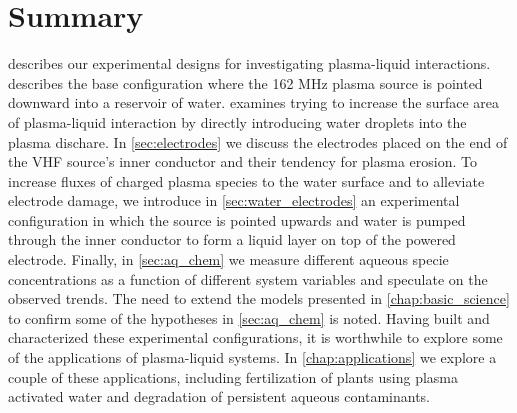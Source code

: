 \section{Summary}

 describes our experimental designs for investigating plasma-liquid interactions.  describes the base configuration where the 162 MHz plasma source is pointed downward into a reservoir of water.  examines trying to increase the surface area of plasma-liquid interaction by directly introducing water droplets into the plasma dischare. In \cref{sec:electrodes} we discuss the electrodes placed on the end of the VHF source's inner conductor and their tendency for plasma erosion. To increase fluxes of charged plasma species to the water surface and to alleviate electrode damage, we introduce in \cref{sec:water_electrodes} an experimental configuration in which the source is pointed upwards and water is pumped through the inner conductor to form a liquid layer on top of the powered electrode. Finally, in \cref{sec:aq_chem} we measure different aqueous specie concentrations as a function of different system variables and speculate on the observed trends. The need to extend the models presented in \cref{chap:basic_science} to confirm some of the hypotheses in \cref{sec:aq_chem} is noted. Having built and characterized these experimental configurations, it is worthwhile to explore some of the applications of plasma-liquid systems. In \cref{chap:applications} we explore a couple of these applications, including fertilization of plants using plasma activated water and degradation of persistent aqueous contaminants.
